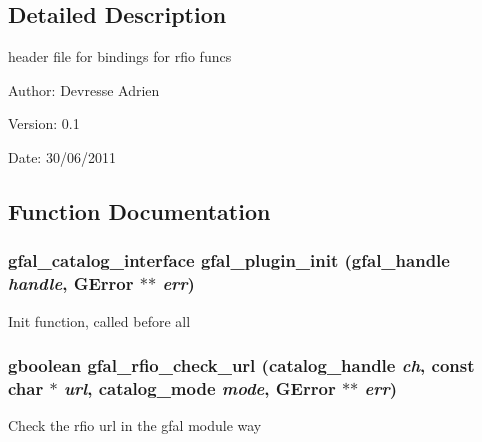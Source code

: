 \subsection{Detailed Description}
header file for bindings for rfio funcs 

\begin{Desc}
\item[Author:]Devresse Adrien \end{Desc}
\begin{Desc}
\item[Version:]0.1 \end{Desc}
\begin{Desc}
\item[Date:]30/06/2011 \end{Desc}


\subsection{Function Documentation}
\subsubsection{\setlength{\rightskip}{0pt plus 5cm}\bf{gfal\_\-catalog\_\-interface} gfal\_\-plugin\_\-init (gfal\_\-handle {\em handle}, GError $\ast$$\ast$ {\em err})}\label{gfal__rfio__plugin__main_8c_5c9edde4d67d96432a319d940a4799f1}


Init function, called before all 
\subsubsection{\setlength{\rightskip}{0pt plus 5cm}gboolean gfal\_\-rfio\_\-check\_\-url (catalog\_\-handle {\em ch}, const char $\ast$ {\em url}, catalog\_\-mode {\em mode}, GError $\ast$$\ast$ {\em err})}\label{gfal__rfio__plugin__main_8c_4ccb47b2adefd1e120cf7bc297c7ddc6}


Check the rfio url in the gfal module way 